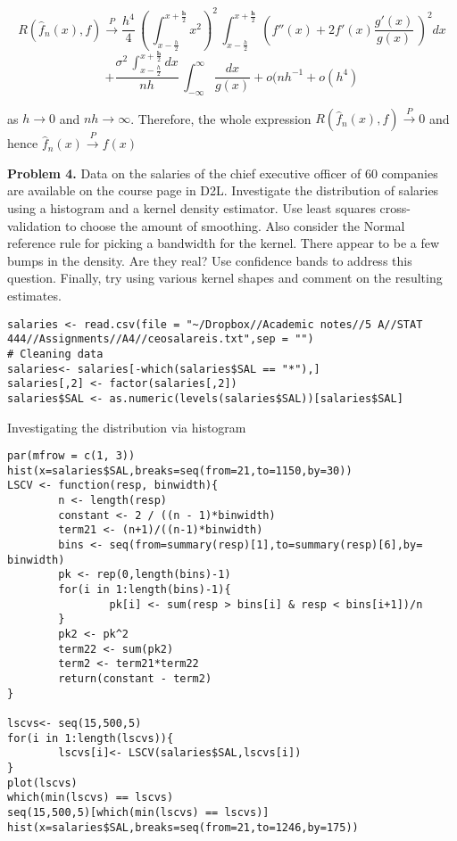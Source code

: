 \documentclass[11pt]{report}
\begin{document}
\begin{itemize}
$$ R(\widehat{f}_n(x),f) \xrightarrow{P} \frac{h^4}{4}\,\left(\,\int_{x-\frac{h}{2}}^{x +\frac{\mathbf{h}}{2}}x^2\right)^{2}\,\int_{x-\frac{h}{2}}^{x +\frac{\mathbf{h}}{2}}\,\left(f''(x) + 2f'(x)\frac{g'(x)}{g(x)}\,\right)^{2}dx $$
$$+ \frac{\sigma^{2}\,\int_{x-\frac{h}{2}}^{x +\frac{\mathbf{h}}{2}}dx}{nh}\,\int_{-\infty}^{\infty}\frac{dx}{g(x)} + o(nh^{-1} + o(h^{4}) $$

as $h \rightarrow 0$ and $nh \rightarrow \infty$. Therefore, the whole expression $ R(\widehat{f}_n(x),f) \xrightarrow{P} 0 $ and hence $\widehat{f}_n(x) \xrightarrow{P} f(x)$
\end{itemize}

\noindent
\newpage 
{\bf Problem 4.} Data on the salaries of the chief executive officer of 60 companies are available on the course page in D2L. 
Investigate the distribution of salaries using a histogram and a kernel density estimator. Use least squares cross-validation to choose the amount of smoothing. Also consider the Normal reference rule for picking a bandwidth for the kernel. There appear to be a few bumps in the density. Are they real? Use confidence bands to address this question. Finally, try using various kernel shapes and comment on the resulting estimates. 

\begin{verbatim}
salaries <- read.csv(file = "~/Dropbox//Academic notes//5 A//STAT 444//Assignments//A4//ceosalareis.txt",sep = "")
# Cleaning data
salaries<- salaries[-which(salaries$SAL == "*"),]
salaries[,2] <- factor(salaries[,2])
salaries$SAL <- as.numeric(levels(salaries$SAL))[salaries$SAL]
\end{verbatim}
 Investigating the distribution via histogram
\begin{verbatim}
par(mfrow = c(1, 3))
hist(x=salaries$SAL,breaks=seq(from=21,to=1150,by=30))
LSCV <- function(resp, binwidth){
        n <- length(resp)
        constant <- 2 / ((n - 1)*binwidth)
        term21 <- (n+1)/((n-1)*binwidth)
        bins <- seq(from=summary(resp)[1],to=summary(resp)[6],by= binwidth)
        pk <- rep(0,length(bins)-1)
        for(i in 1:length(bins)-1){
                pk[i] <- sum(resp > bins[i] & resp < bins[i+1])/n
        }
        pk2 <- pk^2
        term22 <- sum(pk2)
        term2 <- term21*term22
        return(constant - term2)
}

lscvs<- seq(15,500,5)
for(i in 1:length(lscvs)){
        lscvs[i]<- LSCV(salaries$SAL,lscvs[i])        
}
plot(lscvs)
which(min(lscvs) == lscvs)
seq(15,500,5)[which(min(lscvs) == lscvs)]
hist(x=salaries$SAL,breaks=seq(from=21,to=1246,by=175))
\end{verbatim}
\end{document}
